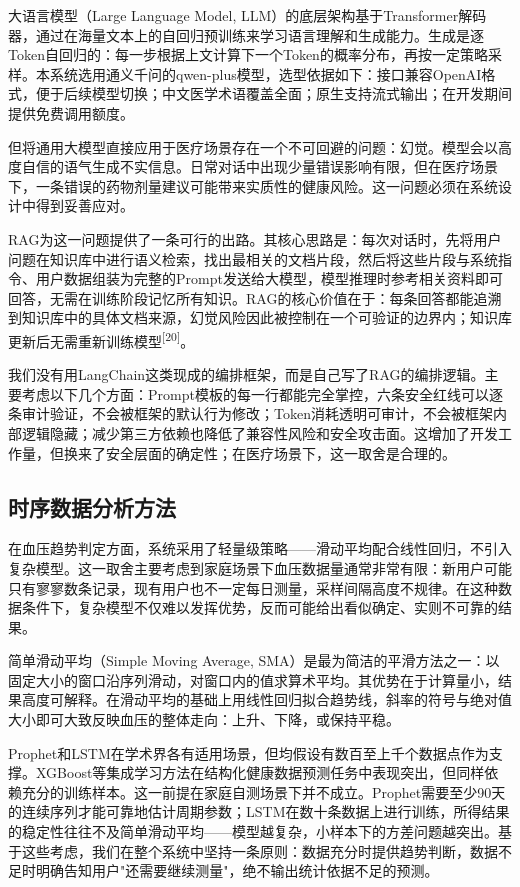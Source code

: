\documentclass[zihao=-4,a4paper]{ctexart}
\numberwithin{figure}{section}
\numberwithin{table}{section}
\begin{document}
大语言模型（Large Language Model, LLM）的底层架构基于Transformer解码器，通过在海量文本上的自回归预训练来学习语言理解和生成能力。生成是逐Token自回归的：每一步根据上文计算下一个Token的概率分布，再按一定策略采样。本系统选用通义千问的qwen-plus模型，选型依据如下：接口兼容OpenAI格式，便于后续模型切换；中文医学术语覆盖全面；原生支持流式输出；在开发期间提供免费调用额度。

但将通用大模型直接应用于医疗场景存在一个不可回避的问题：幻觉。模型会以高度自信的语气生成不实信息。日常对话中出现少量错误影响有限，但在医疗场景下，一条错误的药物剂量建议可能带来实质性的健康风险。这一问题必须在系统设计中得到妥善应对。

RAG为这一问题提供了一条可行的出路。其核心思路是：每次对话时，先将用户问题在知识库中进行语义检索，找出最相关的文档片段，然后将这些片段与系统指令、用户数据组装为完整的Prompt发送给大模型，模型推理时参考相关资料即可回答，无需在训练阶段记忆所有知识。RAG的核心价值在于：每条回答都能追溯到知识库中的具体文档来源，幻觉风险因此被控制在一个可验证的边界内；知识库更新后无需重新训练模型\textsuperscript{[20]}。

我们没有用LangChain这类现成的编排框架，而是自己写了RAG的编排逻辑。主要考虑以下几个方面：Prompt模板的每一行都能完全掌控，六条安全红线可以逐条审计验证，不会被框架的默认行为修改；Token消耗透明可审计，不会被框架内部逻辑隐藏；减少第三方依赖也降低了兼容性风险和安全攻击面。这增加了开发工作量，但换来了安全层面的确定性；在医疗场景下，这一取舍是合理的。

\subsection{时序数据分析方法}

在血压趋势判定方面，系统采用了轻量级策略——滑动平均配合线性回归，不引入复杂模型。这一取舍主要考虑到家庭场景下血压数据量通常非常有限：新用户可能只有寥寥数条记录，现有用户也不一定每日测量，采样间隔高度不规律。在这种数据条件下，复杂模型不仅难以发挥优势，反而可能给出看似确定、实则不可靠的结果。

简单滑动平均（Simple Moving Average, SMA）是最为简洁的平滑方法之一：以固定大小的窗口沿序列滑动，对窗口内的值求算术平均。其优势在于计算量小，结果高度可解释。在滑动平均的基础上用线性回归拟合趋势线，斜率的符号与绝对值大小即可大致反映血压的整体走向：上升、下降，或保持平稳。

Prophet和LSTM在学术界各有适用场景，但均假设有数百至上千个数据点作为支撑。XGBoost等集成学习方法在结构化健康数据预测任务中表现突出，但同样依赖充分的训练样本。这一前提在家庭自测场景下并不成立。Prophet需要至少90天的连续序列才能可靠地估计周期参数；LSTM在数十条数据上进行训练，所得结果的稳定性往往不及简单滑动平均——模型越复杂，小样本下的方差问题越突出。基于这些考虑，我们在整个系统中坚持一条原则：数据充分时提供趋势判断，数据不足时明确告知用户"还需要继续测量"，绝不输出统计依据不足的预测。
\end{document}

